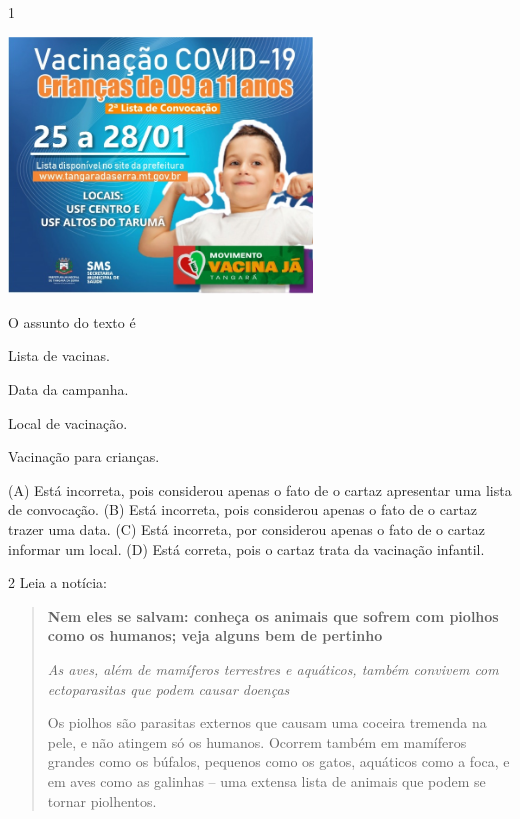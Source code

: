 
\num{1}

\includegraphics[width=3.17910in,height=2.68418in]{media/image124.jpeg}


O assunto do texto é

\begin{escolha}
\item Lista de vacinas.

\item Data da campanha.

\item Local de vacinação.

\item Vacinação para crianças.
\end{escolha}


(A) Está incorreta, pois considerou apenas o fato de o cartaz apresentar uma lista de convocação.
(B) Está incorreta, pois considerou apenas o fato de o cartaz trazer uma data.
(C) Está incorreta, por considerou apenas o fato de o cartaz informar um local.
(D) Está correta, pois o cartaz trata da vacinação infantil.

\num{2} Leia a notícia:

\begin{quote}
\textbf{Nem eles se salvam: conheça os animais que sofrem com piolhos
como os humanos; veja alguns bem de pertinho}

\textit{As aves, além de mamíferos terrestres e aquáticos, também convivem com
ectoparasitas que podem causar doenças}

Os piolhos são parasitas externos que causam uma coceira tremenda na
pele, e não atingem só os humanos. Ocorrem também em mamíferos grandes
como os búfalos, pequenos como os gatos, aquáticos como a foca, e em
aves como as galinhas -- uma extensa lista de animais que podem se
tornar piolhentos.
\end{quote}

